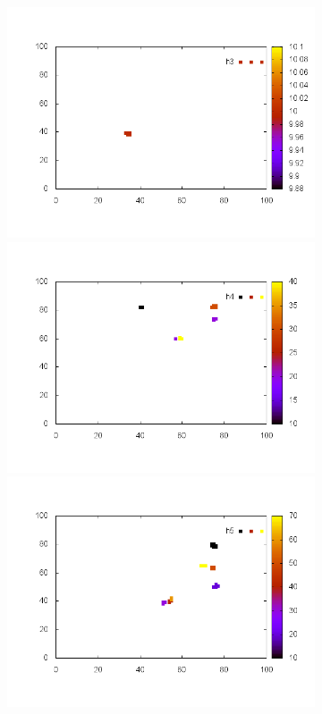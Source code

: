 \documentclass[10pt,a4paper]{article}
\begin{document}
\begin{figure}
\begin{subfigure}[b]{1\textwidth}
\includegraphics[scale=.3]{./img/SCC_Stable3/cut95p/3.png}
\includegraphics[scale=.3]{./img/SCC_Stable3/cut95p/4.png}
\includegraphics[scale=.3]{./img/SCC_Stable3/cut95p/5.png}
\end{subfigure}


\end{figure}
\end{document}
